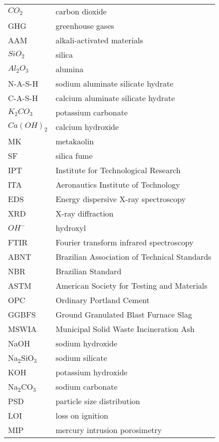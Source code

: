 \begin{longtable}{ll}
$CO_2$ & carbon dioxide \\
GHG & greenhouse gases \\
AAM & alkali-activated materials \\
$ SiO_2$ & silica \\
$ Al_2O_3$ & alumina \\
N-A-S-H & sodium aluminate silicate hydrate \\
C-A-S-H & calcium aluminate silicate hydrate  \\
$K_2CO_3$ & potassium carbonate \\
$Ca(OH)_2$ & calcium hydroxide \\
MK & metakaolin \\
SF & silica fume \\
IPT & Institute for Technological Research \\
ITA & Aeronautics Institute of Technology \\
EDS & Energy dispersive X-ray spectroscopy \\
XRD & X-ray diffraction \\
$OH^-$ & hydroxyl \\
FTIR & Fourier transform infrared spectroscopy \\
ABNT & Brazilian Association of Technical Standards \\
NBR & Brazilian Standard \\
ASTM & American Society for Testing and Materials \\
OPC & Ordinary Portland Cement \\
GGBFS & Ground Granulated Blast Furnace Slag \\
MSWIA & Municipal Solid Waste Incineration Ash \\
NaOH & sodium hydroxide \\
Na$_2$SiO$_3$ & sodium silicate \\
KOH & potassium hydroxide \\
Na$_2$CO$_3$ & sodium carbonate \\
PSD & particle size distribution \\
LOI & loss on ignition \\
MIP & mercury intrusion porosimetry \\
\end{longtable}